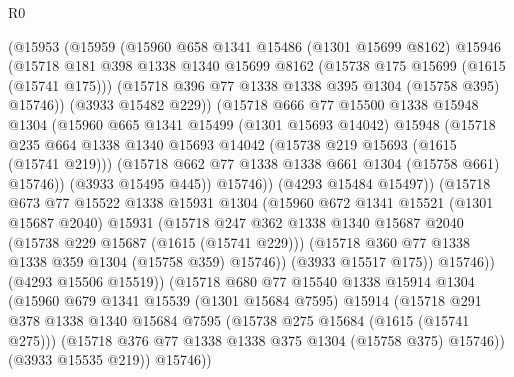 \begin{lexlean}{R0}
\begin{coremodule}
            (@15953
              (@15959
                (@15960
                  @658
                  @1341
                  @15486
                  (@1301 @15699 @8162)
                  @15946
                  (@15718
                    @181
                    @398
                    @1338
                    @1340
                    @15699
                    @8162
                    (@15738 @175 @15699 (@1615 (@15741 @175)))
                    (@15718 @396 @77 @1338 @1338 @395 @1304 (@15758 @395) @15746))
                  (@3933 @15482 @229))
                (@15718
                  @666
                  @77
                  @15500
                  @1338
                  @15948
                  @1304
                  (@15960
                    @665
                    @1341
                    @15499
                    (@1301 @15693 @14042)
                    @15948
                    (@15718
                      @235
                      @664
                      @1338
                      @1340
                      @15693
                      @14042
                      (@15738 @219 @15693 (@1615 (@15741 @219)))
                      (@15718 @662 @77 @1338 @1338 @661 @1304 (@15758 @661) @15746))
                    (@3933 @15495 @445))
                  @15746))
              (@4293 @15484 @15497))
            (@15718
              @673
              @77
              @15522
              @1338
              @15931
              @1304
              (@15960
                @672
                @1341
                @15521
                (@1301 @15687 @2040)
                @15931
                (@15718
                  @247
                  @362
                  @1338
                  @1340
                  @15687
                  @2040
                  (@15738 @229 @15687 (@1615 (@15741 @229)))
                  (@15718 @360 @77 @1338 @1338 @359 @1304 (@15758 @359) @15746))
                (@3933 @15517 @175))
              @15746))
          (@4293 @15506 @15519))
        (@15718
          @680
          @77
          @15540
          @1338
          @15914
          @1304
          (@15960
            @679
            @1341
            @15539
            (@1301 @15684 @7595)
            @15914
            (@15718
              @291
              @378
              @1338
              @1340
              @15684
              @7595
              (@15738 @275 @15684 (@1615 (@15741 @275)))
              (@15718 @376 @77 @1338 @1338 @375 @1304 (@15758 @375) @15746))
            (@3933 @15535 @219))
          @15746))

\end{coremodule}
\end{lexlean}
